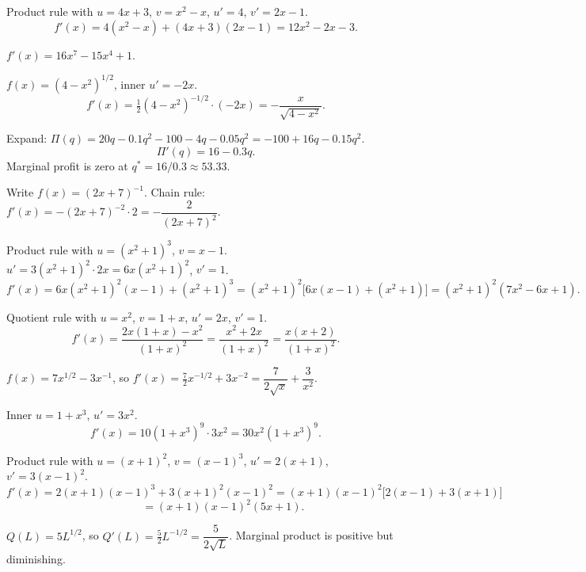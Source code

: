 \begin{solutions}
  \item Product rule with $u=4x+3$, $v=x^{2}-x$, $u'=4$, $v'=2x-1$.
        \[
          f'(x)=4(x^{2}-x)+(4x+3)(2x-1)=12x^{2}-2x-3 .
        \]

  \item $f'(x)=16x^{7}-15x^{4}+1$.

  \item $f(x)=(4-x^{2})^{1/2}$, inner $u'=-2x$.
        \[
          f'(x)=\tfrac12(4-x^{2})^{-1/2}\cdot(-2x)=-\frac{x}{\sqrt{4-x^{2}}} .
        \]

  \item Expand: $\Pi(q)=20q-0.1q^{2}-100-4q-0.05q^{2}
        =-100+16q-0.15q^{2}$.
        \[
          \Pi'(q)=16-0.3q .
        \]
        Marginal profit is zero at $q^{*}=16/0.3\approx 53.33$.

  \item Write $f(x)=(2x+7)^{-1}$. Chain rule: $f'(x)=-(2x+7)^{-2}\cdot 2
        =-\dfrac{2}{(2x+7)^{2}}$.

  \item Product rule with $u=(x^{2}+1)^{3}$, $v=x-1$. $u'=3(x^{2}+1)^{2}
        \cdot 2x=6x(x^{2}+1)^{2}$, $v'=1$.
        \[
          f'(x)=6x(x^{2}+1)^{2}(x-1)+(x^{2}+1)^{3}
               =(x^{2}+1)^{2}\bigl[6x(x-1)+(x^{2}+1)\bigr]
               =(x^{2}+1)^{2}(7x^{2}-6x+1) .
        \]

  \item Quotient rule with $u=x^{2}$, $v=1+x$, $u'=2x$, $v'=1$.
        \[
          f'(x)=\frac{2x(1+x)-x^{2}}{(1+x)^{2}}=\frac{x^{2}+2x}{(1+x)^{2}}
               =\frac{x(x+2)}{(1+x)^{2}} .
        \]

  \item $f(x)=7x^{1/2}-3x^{-1}$, so $f'(x)=\tfrac72x^{-1/2}+3x^{-2}
        =\dfrac{7}{2\sqrt{x}}+\dfrac{3}{x^{2}}$.

  \item Inner $u=1+x^{3}$, $u'=3x^{2}$.
        \[
          f'(x)=10(1+x^{3})^{9}\cdot 3x^{2}=30x^{2}(1+x^{3})^{9} .
        \]

  \item Product rule with $u=(x+1)^{2}$, $v=(x-1)^{3}$, $u'=2(x+1)$,
        $v'=3(x-1)^{2}$.
        \[
          f'(x)=2(x+1)(x-1)^{3}+3(x+1)^{2}(x-1)^{2}
               =(x+1)(x-1)^{2}\bigl[2(x-1)+3(x+1)\bigr]
        \]
        \[
          \phantom{f'(x)}=(x+1)(x-1)^{2}(5x+1) .
        \]

  \item $Q(L)=5L^{1/2}$, so $Q'(L)=\tfrac52L^{-1/2}=\dfrac{5}{2\sqrt{L}}$.
        Marginal product is positive but diminishing.


\end{solutions}
